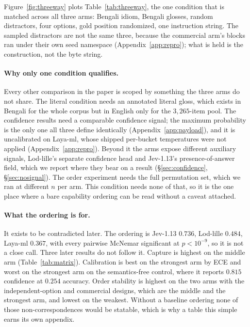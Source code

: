 \documentclass[11pt]{article}
\begin{document}
Figure~\ref{fig:threeway} plots Table~\ref{tab:threeway}, the one condition
that is matched across all three arms: Bengali idiom, Bengali glosses, random
distractors, four options, gold position randomized, one instruction string. The
sampled distractors are not the same three, because the commercial arm's blocks
ran under their own seed namespace (Appendix~\ref{app:repro}); what is held is
the construction, not the byte string.

\paragraph{Why only one condition qualifies.} Every other comparison in the paper
is scoped by something the three arms do not share. The literal condition needs
an annotated literal gloss, which exists in Bengali for the whole corpus but in
English only for the $3{,}265$-item pool. The confidence results need a comparable
confidence signal; the maximum probability is the only one all three define
identically (Appendix~\ref{app:payload}), and it is uncalibrated on Laya-ml, whose
shipped per-bucket temperatures were not applied (Appendix~\ref{app:repro}). Beyond
it the arms expose different auxiliary signals, Lod-lille's separate confidence head
and Jev-1.13's presence-of-answer field, which we report where they bear on a
result (\S\ref{sec:confidence}, \S\ref{sec:nosignal}). The order experiment
needs the full permutation set, which
we ran at different $n$ per arm. This condition needs none of that, so it is the
one place where a bare capability ordering can be read without a caveat attached.

\paragraph{What the ordering is for.} It exists to be contradicted later. The
ordering is Jev-1.13 $0.736$, Lod-lille $0.484$, Laya-ml $0.367$, with every
pairwise McNemar significant at $p<10^{-9}$, so it is not a close call. Three
later results do not follow it. Capture is highest on the middle arm
(Table~\ref{tab:matrix}). Calibration is best on the strongest arm by ECE and
worst on the strongest arm on the semantics-free control, where it reports $0.815$
confidence at $0.254$ accuracy. Order stability is highest on the two arms with the
independent-option and commercial designs, which are the middle and the strongest
arm, and lowest on the weakest. Without a baseline ordering none of those
non-correspondences would be statable, which is why a table this simple earns its
own appendix.
\end{document}
